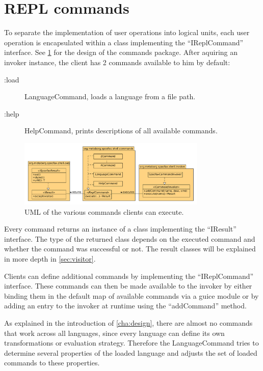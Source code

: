 \section{REPL commands}
\label{sec:commands}

To separate the implementation of user operations into logical units, each user
operation is encapsulated within a class implementing the ``IReplCommand''
interface. See \cref{fig:uml-commands} for the design of the commands package.
After aquiring an invoker instance, the client has 2 commands available to him
by default:

\begin{description}
  \item [:load] LanguageCommand, loads a language from a file path.
  \item [:help] HelpCommand, prints descriptions of all available commands.
\end{description}

\begin{figure}[h]
  \centering
  \includegraphics[width=0.8\textwidth]{uml-commands}
  \caption{UML of the various commands clients can execute.}
  \label{fig:uml-commands}
\end{figure}

Every command returns an instance of a class implementing the ``IResult''
interface. The type of the returned class depends on the executed command and
whether the command was successful or not. The result classes will be explained
in more depth in \cref{sec:visitor}.

Clients can define additional commands by implementing the ``IReplCommand''
interface. These commands can then be made available to the invoker by either
binding them in the default map of available commands via a guice module or by
adding an entry to the invoker at runtime using the ``addCommand'' method.

As explained in the introduction of \cref{cha:design}, there are almost no
commands that work across all languages, since every language can define its
own transformations or evaluation strategy. Therefore the LanguageCommand tries
to determine several properties of the loaded language and adjusts the set of
loaded commands to these properties.

